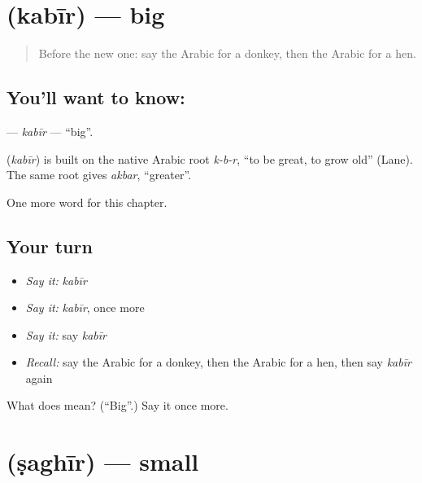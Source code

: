 \section[\texorpdfstring{\ar{كبير} (kabīr)}{كبير (kabīr)}]{ (kabīr) — big}

\label{lesson:AR-C81-kabir}



\begin{quote}
Before the new one: say the Arabic for a donkey, then the Arabic for a hen.
\end{quote}

\subsection*{You'll want to know: }
\textbf{} — \emph{kabīr} — \textquotedblleft{}big\textquotedblright{}.

\begin{cousinweb}
\textbf{} (\emph{kabīr}) is built on the native Arabic root \emph{k-b-r}, \textquotedblleft{}to be great, to grow old\textquotedblright{} (Lane). The same root gives \emph{akbar}, \textquotedblleft{}greater\textquotedblright{}.
\end{cousinweb}

\begin{grammarlens}[title={What you've built}]
One more word for this chapter.
\end{grammarlens}

\subsection*{Your turn}
\begin{itemize}
\raggedright
  \item \emph{Say it:} \emph{kabīr}
  \item \emph{Say it:} \emph{kabīr}, once more
  \item \emph{Say it:} say \emph{kabīr}
  \item \emph{Recall:} say the Arabic for a donkey, then the Arabic for a hen, then say \emph{kabīr} again
\end{itemize}

\begin{tcolorbox}[breakable,colback=teal!4,colframe=teal!35!black,title={Before you move on}]
What does  mean? (\textquotedblleft{}Big\textquotedblright{}.) Say it once more.
\end{tcolorbox}
\section[\texorpdfstring{\ar{صغير} (ṣaghīr)}{صغير (ṣaghīr)}]{ (ṣaghīr) — small}


